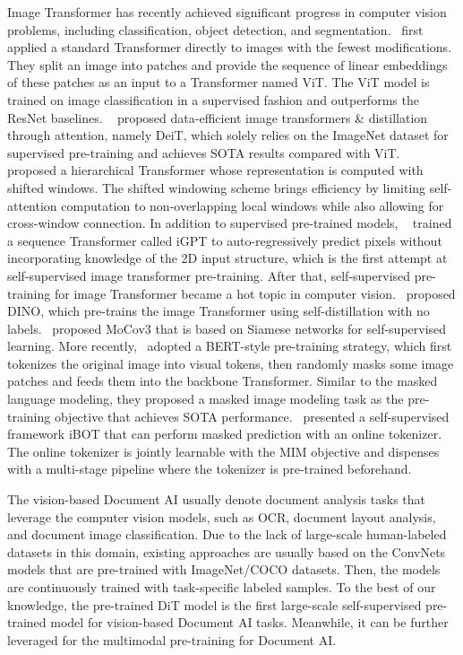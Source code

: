\documentclass[sigconf]{acmart}
\begin{document}
Image Transformer has recently achieved significant progress in computer vision problems, including classification, object detection, and segmentation.~\citep{dosovitskiy2020vit} first applied a standard Transformer directly to images with the fewest modifications. They split an image into  patches and provide the sequence of linear embeddings of these patches as an input to a Transformer named ViT. The ViT model is trained on image classification in a supervised fashion and outperforms the ResNet baselines. ~\citep{touvron2020deit} proposed data-efficient image transformers \& distillation through attention, namely DeiT, which solely relies on the ImageNet dataset for supervised pre-training and achieves SOTA results compared with ViT. ~\citep{liu2021swin} proposed a hierarchical Transformer whose
representation is computed with shifted windows. The shifted windowing scheme brings efficiency by limiting self-attention computation to non-overlapping local windows while also allowing for cross-window connection. In addition to supervised pre-trained models, ~\citep{pmlr-v119-chen20s} trained a sequence Transformer called iGPT to auto-regressively predict pixels without incorporating knowledge of the 2D input structure, which is the first attempt at self-supervised image transformer pre-training. After that, self-supervised pre-training for image Transformer became a hot topic in computer vision.~\citep{caron2021emerging} proposed DINO, which pre-trains the image Transformer using self-distillation with no labels.~\citep{chen2021empirical} proposed MoCov3 that is based on Siamese networks for self-supervised learning. More recently,~\citep{bao2021beit} adopted a BERT-style pre-training strategy, which first tokenizes the original image into visual tokens, then randomly masks some image patches and feeds them into the backbone Transformer. Similar to the masked language modeling, they proposed a masked image modeling task as the pre-training objective that achieves SOTA performance.~\citep{zhou2021ibot} presented a self-supervised framework iBOT that can perform masked prediction with an online tokenizer. The online tokenizer is jointly learnable with the MIM objective and dispenses with a multi-stage pipeline where the tokenizer is pre-trained beforehand.

The vision-based Document AI usually denote document analysis tasks that leverage the computer vision models, such as OCR, document layout analysis, and document image classification. Due to the lack of large-scale human-labeled datasets in this domain, existing approaches are usually based on the ConvNets models that are pre-trained with ImageNet/COCO datasets. Then, the models are continuously trained with task-specific labeled samples. To the best of our knowledge, the pre-trained DiT model is the first large-scale self-supervised pre-trained model for vision-based Document AI tasks. Meanwhile, it can be further leveraged for the multimodal pre-training for Document AI.
\end{document}
